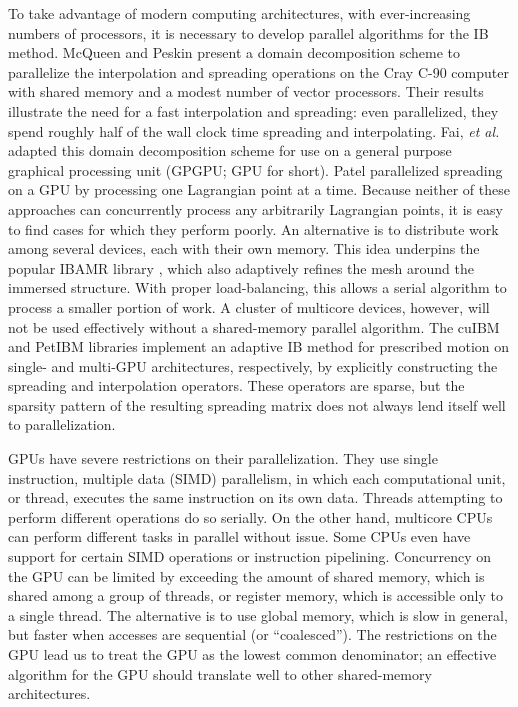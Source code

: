 To take advantage of modern computing architectures, with ever-increasing numbers of
processors, it is necessary to develop parallel algorithms for the IB method.
McQueen and Peskin \cite{McQueen:1997kw} present a domain decomposition scheme to
parallelize the interpolation and spreading operations on the Cray C-90 computer with
shared memory and a modest number of vector processors. Their results illustrate the need
for a fast interpolation and spreading: even parallelized, they spend roughly half of the
wall clock time spreading and interpolating. Fai, \textit{et al.} \cite{Fai:2013do}
adapted this domain decomposition scheme for use on a general purpose graphical
processing unit (GPGPU; GPU for short). Patel \cite{Patel:2012tc} parallelized spreading
on a GPU by processing one Lagrangian point at a time. Because neither of these
approaches can concurrently process any arbitrarily Lagrangian points, it is easy to find
cases for which they perform poorly. An alternative is to distribute work among several
devices, each with their own memory. This idea underpins the popular IBAMR library
\cite{Griffith:2007uk,Griffith:2007do,Griffith:2009gg, Griffith:2011gi, Griffith:2017id},
which also adaptively refines the mesh around the immersed structure. With proper
load-balancing, this allows a serial algorithm to process a smaller portion of work.
A cluster of multicore devices, however, will not be used effectively without a
shared-memory parallel algorithm. The cuIBM \cite{Layton:2011um} and PetIBM
\cite{Chuang:2018ej} libraries implement an adaptive IB method for prescribed motion on
single- and multi-GPU architectures, respectively, by explicitly constructing the
spreading and interpolation operators. These operators are sparse, but the sparsity
pattern of the resulting spreading matrix does not always lend itself well to
parallelization.

GPUs have severe restrictions on their parallelization. They use single instruction,
multiple data (SIMD) parallelism, in which each computational unit, or thread, executes
the same instruction on its own data. Threads attempting to perform different operations
do so serially. On the other hand, multicore CPUs can perform different tasks in parallel
without issue. Some CPUs even have support for certain SIMD operations or instruction
pipelining. Concurrency on the GPU can be limited by exceeding the amount of shared
memory, which is shared among a group of threads, or register memory, which is accessible
only to a single thread. The alternative is to use global memory, which is slow in
general, but faster when accesses are sequential (or ``coalesced''). The restrictions on
the GPU lead us to treat the GPU as the lowest common denominator; an effective algorithm
for the GPU should translate well to other shared-memory architectures.

